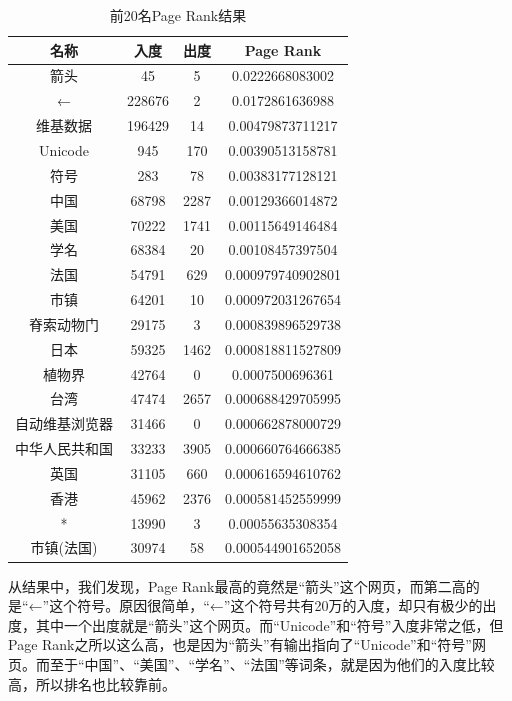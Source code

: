 \documentclass[paper=a4, fontsize=11pt, UTF8]{article} %
\numberwithin{equation}{section} %
\numberwithin{figure}{section} %
\numberwithin{table}{section} %
\begin{document}
\begin{table}[htp]
\centering
\begin{tabular}{@{}cccc@{}}
\toprule
名称      & 入度     & 出度   & Page Rank         \\ \midrule
箭头      & 45     & 5    & 0.0222668083002   \\
←       & 228676 & 2    & 0.0172861636988   \\
维基数据    & 196429 & 14   & 0.00479873711217  \\
Unicode & 945    & 170  & 0.00390513158781  \\
符号      & 283    & 78   & 0.00383177128121  \\
中国      & 68798  & 2287 & 0.00129366014872  \\
美国      & 70222  & 1741 & 0.00115649146484  \\
学名      & 68384  & 20   & 0.00108457397504  \\
法国      & 54791  & 629  & 0.000979740902801 \\
市镇      & 64201  & 10   & 0.000972031267654 \\
脊索动物门   & 29175  & 3    & 0.000839896529738 \\
日本      & 59325  & 1462 & 0.000818811527809 \\
植物界     & 42764  & 0    & 0.0007500696361   \\
台湾      & 47474  & 2657 & 0.000688429705995 \\
自动维基浏览器 & 31466  & 0    & 0.000662878000729 \\
中华人民共和国 & 33233  & 3905 & 0.000660764666385 \\
英国      & 31105  & 660  & 0.000616594610762 \\
香港      & 45962  & 2376 & 0.000581452559999 \\
*       & 13990  & 3    & 0.00055635308354  \\
市镇(法国)  & 30974  & 58   & 0.000544901652058 \\ \bottomrule
\end{tabular}
\caption{前20名Page Rank结果}\label{table1}
\end{table}

从结果中，我们发现，Page Rank最高的竟然是“箭头”这个网页，而第二高的是“←”这个符号。原因很简单，“←”这个符号共有20万的入度，却只有极少的出度，其中一个出度就是“箭头”这个网页。而“Unicode”和“符号”入度非常之低，但Page Rank之所以这么高，也是因为“箭头”有输出指向了“Unicode”和“符号”网页。而至于“中国”、“美国”、“学名”、“法国”等词条，就是因为他们的入度比较高，所以排名也比较靠前。
\end{document}
